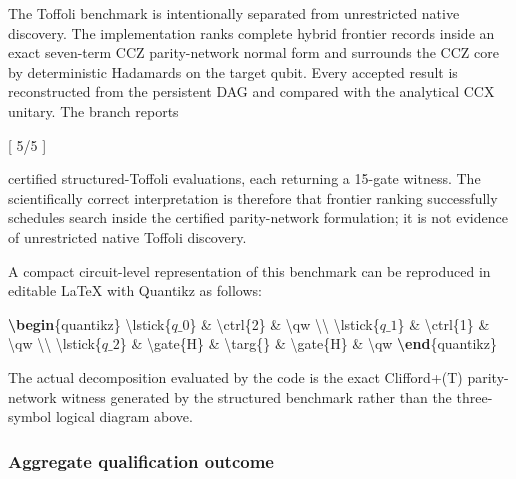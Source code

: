 \documentclass[
]{article}
\newenvironment{Shaded}{}{}
\newcommand{\ExtensionTok}[1]{#1}
\newcommand{\FunctionTok}[1]{\textcolor[rgb]{0.02,0.16,0.49}{#1}}
\newcommand{\KeywordTok}[1]{\textcolor[rgb]{0.00,0.44,0.13}{\textbf{#1}}}
\newcommand{\NormalTok}[1]{#1}
\newcommand{\SpecialStringTok}[1]{\textcolor[rgb]{0.73,0.40,0.53}{#1}}
\begin{document}
The Toffoli benchmark is intentionally separated from unrestricted
native discovery. The implementation ranks complete hybrid frontier
records inside an exact seven-term CCZ parity-network normal form and
surrounds the CCZ core by deterministic Hadamards on the target qubit.
Every accepted result is reconstructed from the persistent DAG and
compared with the analytical CCX unitary. The branch reports

{[} 5/5  {]}

certified structured-Toffoli evaluations, each returning a 15-gate
witness. The scientifically correct interpretation is therefore that
frontier ranking successfully schedules search inside the certified
parity-network formulation; it is not evidence of unrestricted native
Toffoli discovery.

A compact circuit-level representation of this benchmark can be
reproduced in editable LaTeX with Quantikz as follows:

\begin{Shaded}
\begin{Highlighting}[]
\KeywordTok{\textbackslash{}begin}\NormalTok{\{}\ExtensionTok{quantikz}\NormalTok{\}}
\FunctionTok{\textbackslash{}lstick}\NormalTok{\{}\SpecialStringTok{$q\_0$}\NormalTok{\} \& }\FunctionTok{\textbackslash{}ctrl}\NormalTok{\{2\} \& }\FunctionTok{\textbackslash{}qw} \FunctionTok{\textbackslash{}\textbackslash{}}
\FunctionTok{\textbackslash{}lstick}\NormalTok{\{}\SpecialStringTok{$q\_1$}\NormalTok{\} \& }\FunctionTok{\textbackslash{}ctrl}\NormalTok{\{1\} \& }\FunctionTok{\textbackslash{}qw} \FunctionTok{\textbackslash{}\textbackslash{}}
\FunctionTok{\textbackslash{}lstick}\NormalTok{\{}\SpecialStringTok{$q\_2$}\NormalTok{\} \& }\FunctionTok{\textbackslash{}gate}\NormalTok{\{H\} \& }\FunctionTok{\textbackslash{}targ}\NormalTok{\{\} \& }\FunctionTok{\textbackslash{}gate}\NormalTok{\{H\} \& }\FunctionTok{\textbackslash{}qw}
\KeywordTok{\textbackslash{}end}\NormalTok{\{}\ExtensionTok{quantikz}\NormalTok{\}}
\end{Highlighting}
\end{Shaded}

The actual decomposition evaluated by the code is the exact Clifford+(T)
parity-network witness generated by the structured benchmark rather than
the three-symbol logical diagram above.

\hypertarget{aggregate-qualification-outcome}{%
\subsubsection{Aggregate qualification
outcome}\label{aggregate-qualification-outcome}}
\end{document}
